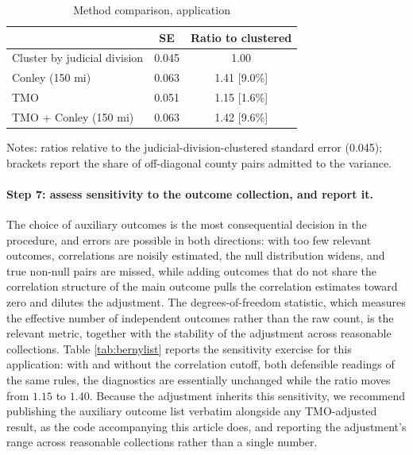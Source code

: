 \documentclass[varwidth,bib]{statapress}
\begin{document}
\begin{stlog}

\end{stlog}

\begin{table}[H]
\centering
\caption{Method comparison, \citet{Berninietal2023} application}
\label{tab:berncompare}
\begin{threeparttable}
\begin{tabular}{lcc}
\toprule
 & SE & Ratio to clustered \\
\midrule
Cluster by judicial division  & 0.045 & 1.00          \\
Conley (150 mi)               & 0.063 & 1.41 [9.0\%]  \\
TMO                           & 0.051 & 1.15 [1.6\%]  \\
TMO + Conley (150 mi)         & 0.063 & 1.42 [9.6\%]  \\
\bottomrule
\end{tabular}
\begin{tablenotes}[flushleft]
\setlength{}\scriptsize
\item Notes: ratios relative to the judicial-division-clustered standard error (0.045); brackets report the share of off-diagonal county pairs admitted to the variance.
\end{tablenotes}
\end{threeparttable}
\end{table}

\paragraph{Step 7: assess sensitivity to the outcome collection, and report it.}
The choice of auxiliary outcomes is the most consequential decision in the procedure, and errors are possible in both directions: with too few relevant outcomes, correlations are noisily estimated, the null distribution widens, and true non-null pairs are missed, while adding outcomes that do not share the correlation structure of the main outcome pulls the correlation estimates toward zero and dilutes the adjustment.  The degrees-of-freedom statistic, which measures the effective number of independent outcomes rather than the raw count, is the relevant metric, together with the stability of the adjustment across reasonable collections.  Table \ref{tab:bernylist} reports the sensitivity exercise for this application: with and without the correlation cutoff, both defensible readings of the same rules, the diagnostics are essentially unchanged while the ratio moves from $1.15$ to $1.40$.  Because the adjustment inherits this sensitivity, we recommend publishing the auxiliary outcome list verbatim alongside any TMO-adjusted result, as the code accompanying this article does, and reporting the adjustment's range across reasonable collections rather than a single number.
\end{document}
